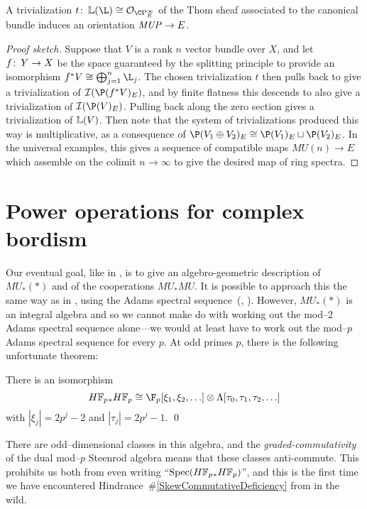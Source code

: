\begin{theorem}\label{ComplexOrientationsInTermsOfTrivs}
A trivialization \(t\co \ThomSheaf{\L} \cong \sheaf O_{\CP^\infty_E}\) of the Thom sheaf associated to the canonical bundle induces an orientation \(\mathit{MUP} \to E\).
\end{theorem}
\begin{proof}[Proof sketch]
Suppose that \(V\) is a rank \(n\) vector bundle over \(X\), and let \(f\colon\thinspace Y \to X\) be the space guaranteed by the splitting principle to provide an isomorphism \(f^* V \cong \bigoplus_{j=1}^n \L_j\).  The chosen trivialization \(t\) then pulls back to give a trivialization of \(\sheaf I(\P(f^* V)_E)\), and by finite flatness this descends to also give a trivialization of \(\sheaf I(\P(V)_E)\).  Pulling back along the zero section gives a trivialization of \(\mathbb{L}(V)\).  Then note that the system of trivializations produced this way is multiplicative, as a consequence of \(\P(V_1 \oplus V_2)_E \cong \P(V_1)_E \sqcup \P(V_2)_E\).  In the universal examples, this gives a sequence of compatible maps \(MU(n) \to E\) which assemble on the colimit \(n \to \infty\) to give the desired map of ring spectra.
\end{proof}










\section{Power operations for complex bordism}\label{QuillenPowerOpnsSection}

Our eventual goal, like in , is to give an algebro-geometric description of \(MU_*(*)\) and of the cooperations \(MU_* MU\).  It is possible to approach this the same way as in , using the Adams spectral sequence~(\cite[Theorem 2]{QuillenAdamsSS}, \cite[Lecture 9]{LurieChromaticCourseNotes}).  However, \(MU_*(*)\) is an integral algebra and so we cannot make do with working out the mod--\(2\) Adams spectral sequence alone---we would at least have to work out the mod--\(p\) Adams spectral sequence for every \(p\).  At odd primes \(p\), there is the following unfortunate theorem:
\begin{theorem}
There is an isomorphism
\[\HFp_* \HFp \cong \F_p[\xi_1, \xi_2, \ldots] \otimes \Lambda[\tau_0, \tau_1, \tau_2, \ldots]\]
with \(|\xi_j| = 2p^j-2\) and \(|\tau_j| = 2p^j - 1\). \qed
\end{theorem}
\noindent There are odd--dimensional classes in this algebra, and the \emph{graded-commutativity} of the dual mod--\(p\) Steenrod algebra means that these classes anti-commute.  This prohibits us both from even writing ``\(\Spec(\HFp_* \HFp)\)'', and this is the first time we have encountered Hindrance~\#\ref{SkewCommutativeDeficiency} from  in the wild.

